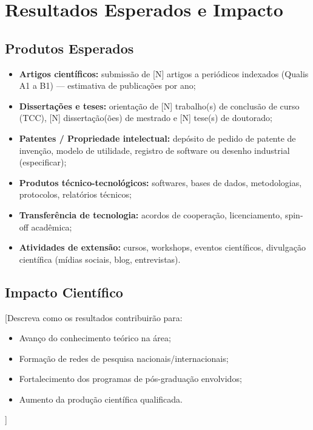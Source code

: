 \documentclass[
  12pt,
  a4paper,
  oneside,
  english,      %
  brazil
]{article}
\begin{document}
\newpage
\section{Resultados Esperados e Impacto}

\subsection{Produtos Esperados}

\begin{itemize}
  \item \textbf{Artigos científicos:} submissão de [N] artigos a
        periódicos indexados (Qualis A1 a B1) — estimativa de
        publicações por ano;
  \item \textbf{Dissertações e teses:} orientação de [N] trabalho(s)
        de conclusão de curso (TCC), [N] dissertação(ões) de mestrado
        e [N] tese(s) de doutorado;
  \item \textbf{Patentes / Propriedade intelectual:} depósito de
        pedido de patente de invenção, modelo de utilidade, registro
        de software ou desenho industrial (especificar);
  \item \textbf{Produtos técnico-tecnológicos:} softwares, bases de
        dados, metodologias, protocolos, relatórios técnicos;
  \item \textbf{Transferência de tecnologia:} acordos de cooperação,
        licenciamento, spin-off acadêmica;
  \item \textbf{Atividades de extensão:} cursos, workshops, eventos
        científicos, divulgação científica (mídias sociais, blog,
        entrevistas).
\end{itemize}

\subsection{Impacto Científico}

[Descreva como os resultados contribuirão para:
\begin{itemize}
  \item Avanço do conhecimento teórico na área;
  \item Formação de redes de pesquisa nacionais/internacionais;
  \item Fortalecimento dos programas de pós-graduação envolvidos;
  \item Aumento da produção científica qualificada.
\end{itemize}]
\end{document}
